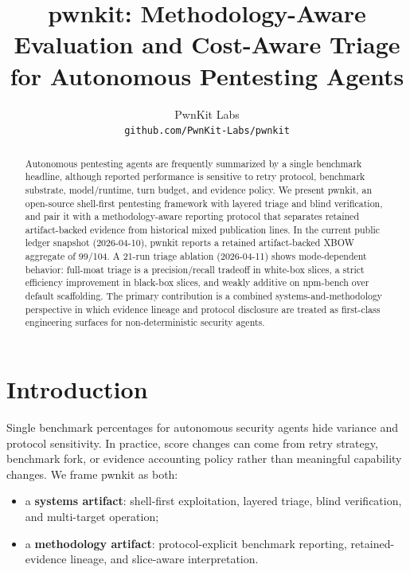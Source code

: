 \documentclass[11pt]{article}
\title{pwnkit: Methodology-Aware Evaluation and Cost-Aware Triage for Autonomous Pentesting Agents}
\author{
  PwnKit Labs \\
  \texttt{github.com/PwnKit-Labs/pwnkit}
}
\date{}
\begin{document}
\maketitle

\begin{abstract}
Autonomous pentesting agents are frequently summarized by a single benchmark
headline, although reported performance is sensitive to retry protocol,
benchmark substrate, model/runtime, turn budget, and evidence policy. We
present pwnkit, an open-source shell-first pentesting framework with layered
triage and blind verification, and pair it with a methodology-aware reporting
protocol that separates retained artifact-backed evidence from historical mixed
publication lines. In the current public ledger snapshot (2026-04-10), pwnkit
reports a retained artifact-backed XBOW aggregate of 99/104. A 21-run triage
ablation (2026-04-11) shows mode-dependent behavior: full-moat triage is a
precision/recall tradeoff in white-box slices, a strict efficiency improvement
in black-box slices, and weakly additive on npm-bench over default scaffolding.
The primary contribution is a combined systems-and-methodology perspective in
which evidence lineage and protocol disclosure are treated as first-class
engineering surfaces for non-deterministic security agents.
\end{abstract}

\section{Introduction}

Single benchmark percentages for autonomous security agents hide variance and
protocol sensitivity. In practice, score changes can come from retry strategy,
benchmark fork, or evidence accounting policy rather than meaningful capability
changes. We frame pwnkit as both:

\begin{itemize}[leftmargin=*]
  \item a \textbf{systems artifact}: shell-first exploitation, layered triage,
  blind verification, and multi-target operation;
  \item a \textbf{methodology artifact}: protocol-explicit benchmark reporting,
  retained-evidence lineage, and slice-aware interpretation.
\end{itemize}
\end{document}
